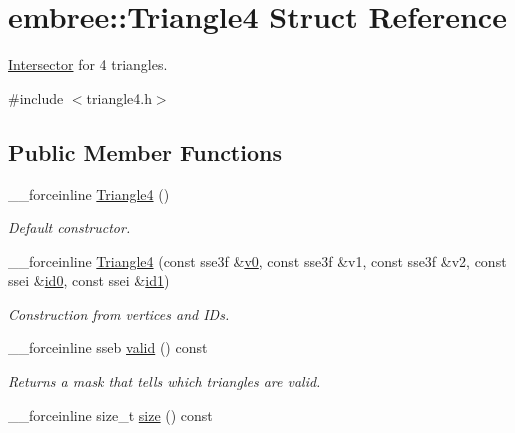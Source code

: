 \hypertarget{structembree_1_1_triangle4}{
\section{embree::Triangle4 Struct Reference}
\label{structembree_1_1_triangle4}
}


\hyperlink{classembree_1_1_intersector}{Intersector} for 4 triangles.  




{\ttfamily \#include $<$triangle4.h$>$}

\subsection*{Public Member Functions}
\begin{DoxyCompactItemize}
\item 
\_\-\_\-forceinline \hyperlink{structembree_1_1_triangle4_a1e783fdc515258970926889af778547b}{Triangle4} ()
\begin{DoxyCompactList}\small\item\em Default constructor. \item\end{DoxyCompactList}\item 
\_\-\_\-forceinline \hyperlink{structembree_1_1_triangle4_a61339e30b52ac95adc3d11c580d8a22c}{Triangle4} (const sse3f \&\hyperlink{structembree_1_1_triangle4_a6c0d196de65c16626387c56ba45b019d}{v0}, const sse3f \&v1, const sse3f \&v2, const ssei \&\hyperlink{structembree_1_1_triangle4_ac3629f411789f1190eea10d3f104bb2d}{id0}, const ssei \&\hyperlink{structembree_1_1_triangle4_af3ef7b3e6c8140aad0ee6de92083348b}{id1})
\begin{DoxyCompactList}\small\item\em Construction from vertices and IDs. \item\end{DoxyCompactList}\item 
\_\-\_\-forceinline sseb \hyperlink{structembree_1_1_triangle4_acfedbc169bef2256b46d976e042324d3}{valid} () const 
\begin{DoxyCompactList}\small\item\em Returns a mask that tells which triangles are valid. \item\end{DoxyCompactList}\item 
\_\-\_\-forceinline size\_\-t \hyperlink{structembree_1_1_triangle4_aac5e451d8c692ab40cb1f14f1ea02551}{size} () const 

\end{DoxyCompactItemize}
